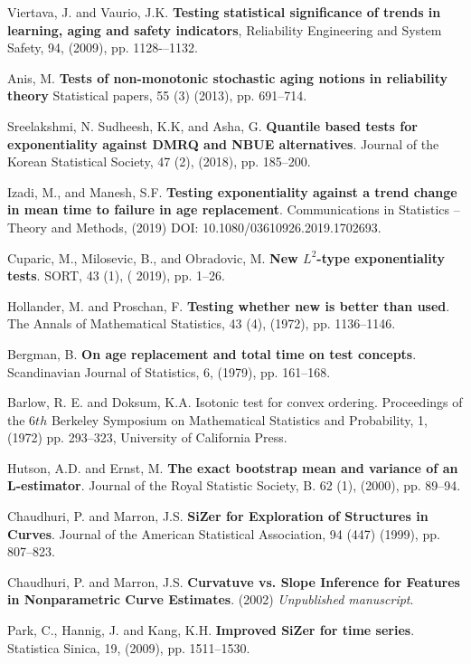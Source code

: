\documentclass[preprint,12pt]{elsarticle}
\begin{document}
\begin{thebibliography}{}
 Viertava, J. and  Vaurio, J.K. {\bf Testing statistical significance of trends in learning, aging and safety indicators}, Reliability Engineering and System Safety,  94, (2009), pp. 1128-–1132.

 Anis, M. {\bf Tests of non-monotonic stochastic aging notions in reliability theory} Statistical papers, 55 (3) (2013), pp. 691--714.

 Sreelakshmi, N. Sudheesh, K.K, and Asha, G. {\bf Quantile based tests for exponentiality against DMRQ and NBUE alternatives}. Journal of the Korean Statistical Society, 47 (2), (2018), pp. 185--200.

 Izadi, M., and Manesh, S.F. {\bf Testing exponentiality against a trend change in mean time to failure in age replacement}. Communications in Statistics -- Theory and Methods, (2019) DOI: 10.1080/03610926.2019.1702693.


 Cuparic, M., Milosevic, B., and Obradovic, M. {\bf New $L^2$-type exponentiality tests}. SORT, 43 (1), ( 2019), pp. 1--26.

  Hollander, M. and Proschan, F. \textbf{Testing whether new is better than used}. The Annals of Mathematical Statistics, 43 (4), (1972), pp. 1136--1146.

 Bergman, B. {\bf On age replacement and total time on test concepts}. Scandinavian Journal of Statistics, 6, (1979), pp. 161--168.

 Barlow, R. E. and Doksum, K.A. Isotonic test for convex ordering. Proceedings of the 6$th$ Berkeley Symposium on Mathematical Statistics and Probability, 1, (1972) pp. 293--323, University of California Press.


 Hutson, A.D. and Ernst, M. \textbf{The exact bootstrap mean and variance of an L-estimator}. Journal of the Royal Statistic Society, B. 62 (1), (2000), pp. 89--94.


 Chaudhuri, P. and Marron, J.S. \textbf{SiZer for Exploration of Structures in Curves}. Journal of the American Statistical Association, 94 (447) (1999), pp. 807--823.

 Chaudhuri, P. and Marron, J.S. \textbf{Curvatuve vs. Slope Inference for Features in Nonparametric Curve Estimates}. (2002) {\it Unpublished manuscript}.

 Park, C., Hannig, J. and Kang, K.H. \textbf{Improved SiZer for time series}. Statistica Sinica, 19, (2009), pp. 1511--1530.


\end{thebibliography}
\end{document}
